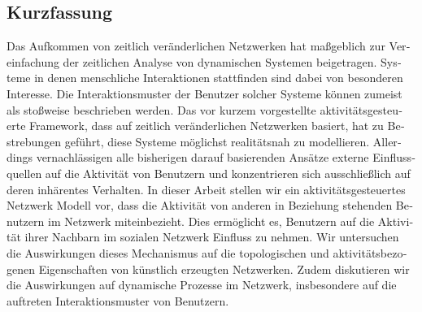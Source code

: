 \begin{otherlanguage}{ngerman}

\chapter*{Kurzfassung}
\label{cha:kurzfassung}

Das Aufkommen von zeitlich veränderlichen Netzwerken hat maßgeblich zur Vereinfachung der zeitlichen Analyse von dynamischen Systemen beigetragen.
Systeme in denen menschliche Interaktionen stattfinden sind dabei von besonderen Interesse.
Die Interaktionsmuster der Benutzer solcher Systeme können zumeist als stoßweise beschrieben werden.
Das vor kurzem vorgestellte aktivitätsgesteuerte Framework, dass auf zeitlich veränderlichen Netzwerken basiert, hat zu Bestrebungen geführt, diese Systeme möglichst realitätsnah zu modellieren.
Allerdings vernachlässigen alle bisherigen darauf basierenden Ansätze externe Einflussquellen auf die Aktivität von Benutzern und konzentrieren sich ausschließlich auf deren inhärentes Verhalten.
In dieser Arbeit stellen wir ein aktivitätsgesteuertes Netzwerk Modell vor, dass die Aktivität von anderen in Beziehung stehenden Benutzern im Netzwerk miteinbezieht.
Dies ermöglicht es, Benutzern auf die Aktivität ihrer Nachbarn im sozialen Netzwerk Einfluss zu nehmen.
Wir untersuchen die Auswirkungen dieses Mechanismus auf die topologischen und aktivitätsbezogenen Eigenschaften von künstlich erzeugten Netzwerken.
Zudem diskutieren wir die Auswirkungen auf dynamische Prozesse im Netzwerk, insbesondere auf die auftreten Interaktionsmuster von Benutzern.

\end{otherlanguage}
